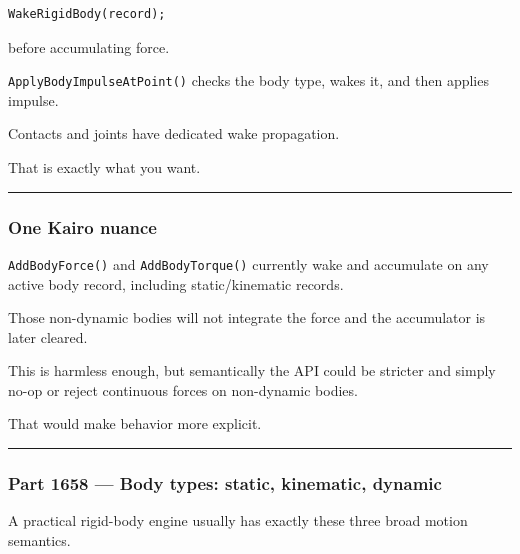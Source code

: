 \begin{verbatim}
WakeRigidBody(record);
\end{verbatim}

before accumulating force.

\texttt{ApplyBodyImpulseAtPoint()} checks the body type, wakes it, and then applies impulse.

Contacts and joints have dedicated wake propagation.

That is exactly what you want.

\begin{center}\rule{0.5\linewidth}{0.5pt}\end{center}

\subsubsection{One Kairo nuance}\label{one-kairo-nuance}

\texttt{AddBodyForce()} and \texttt{AddBodyTorque()} currently wake and accumulate on any active body record, including static/kinematic records.

Those non-dynamic bodies will not integrate the force and the accumulator is later cleared.

This is harmless enough, but semantically the API could be stricter and simply no-op or reject continuous forces on non-dynamic bodies.

That would make behavior more explicit.

\begin{center}\rule{0.5\linewidth}{0.5pt}\end{center}

\subsubsection{Part 1658 --- Body types: static, kinematic, dynamic}\label{part-1658-body-types-static-kinematic-dynamic}

A practical rigid-body engine usually has exactly these three broad motion semantics.

